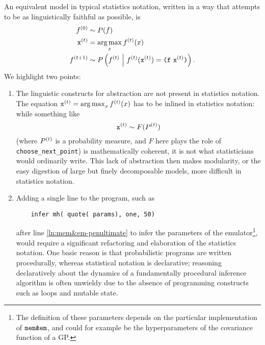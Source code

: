 An equivalent model in typical statistics notation, written in a way that
attempts to be as linguistically faithful as possible, is
\begin{align*}
  \s{0}f &\sim P(f) \\
  \s{t}\xtt &= \argmax_x \s{t}f(x) \\
  \s{t+1}f &\sim P\pn{\s{t}f \mvert \s{t}f(\s{t}\xtt) = \texttt(\ftt\ \s{t}\xtt\texttt)}.
\end{align*}
We highlight two points:
\begin{enumerate}
  \item The linguistic constructs for abstraction are not present in
    statistics notation.  The equation $\s{t}\xtt = \argmax_x \s{t}f(x)$
    has to be inlined in statistics notation: while something like
    \[ \s{t}\xtt \sim F(\s{t}P) \]
    (where $\s{t}P$ is a probability measure, and $F$ here plays the role of
    \texttt{choose\_next\_point}) is mathematically coherent, it is not what
    statisticians would ordinarily write.  This lack of abstraction then makes
    modularity, or the easy digestion of large but finely decomposable models,
    more difficult in statistics notation.

  \item Adding a single line to the program, such as
    \begin{lstlisting}
    infer mh( quote( params), one, 50)
    \end{lstlisting}
    after line \ref{ln:mem&em-penultimate} to infer the parameters of the
    emulator\footnote{
      The definition of these parameters depends on the particular
      implementation of $\mm$, and could for example be the hyperparameters
      of the covariance function of a GP.
    }, would require a significant refactoring and elaboration of the statistics
    notation.  One basic reason is that probabilistic programs are written
    procedurally, whereas statistical notation is declarative; reasoning
    declaratively about the dynamics of a fundamentally procedural inference
    algorithm is often unwieldy due to the absence of programming constructs
    such as loops and mutable state.
\end{enumerate}
